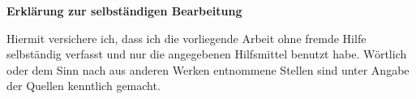\ifdefined\ISuppressStatement
\else
\clearpage
\thispagestyle{plain}
\ITocEntryStatement
\textbf{\sffamily\large Erklärung zur selbständigen Bearbeitung}

Hiermit versichere ich, dass ich die vorliegende
Arbeit ohne fremde Hilfe selbständig verfasst und nur die
angegebenen Hilfsmittel benutzt habe.
Wörtlich oder dem Sinn nach aus anderen Werken entnommene Stellen sind unter
Angabe der Quellen kenntlich gemacht.

\vspace{1cm}
\noindent\makebox[3cm]{\hrulefill} \hspace{0.1cm}
    \makebox[3cm]{\hrulefill} \hspace{0.1cm}
    \makebox[6cm]{\hrulefill} \\
\noindent{} \hspace{0.1cm}
     \hspace{0.1cm}

\clearpage
\fi